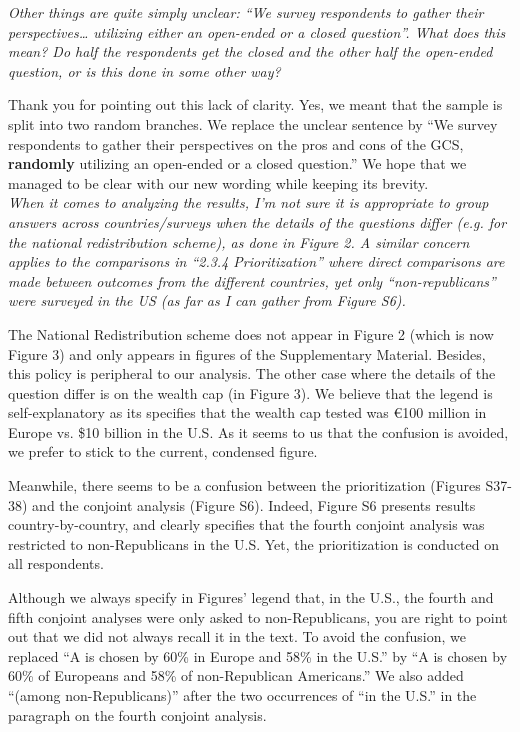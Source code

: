 \documentclass[12pt,english]{article}
\begin{document}
\textit{Other things are quite simply unclear: “We survey respondents to gather their perspectives… utilizing either an open-ended or a closed question”. What does this mean? Do half the respondents get the closed and the other half the open-ended question, or is this done in some other way?}

Thank you for pointing out this lack of clarity. Yes, we meant that the sample is split into two random branches. We replace the unclear sentence by ``We survey respondents to gather their perspectives on the pros and cons of the GCS, \textbf{randomly} utilizing an open-ended or a closed question.'' We hope that we managed to be clear with our new wording while keeping its brevity.
~\\

\textit{When it comes to analyzing the results, I’m not sure it is appropriate to group answers across countries/surveys when the details of the questions differ (e.g. for the national redistribution scheme), as done in Figure 2. A similar concern applies to the comparisons in “2.3.4 Prioritization” where direct comparisons are made between outcomes from the different countries, yet only “non-republicans” were surveyed in the US (as far as I can gather from Figure S6).}

The National Redistribution scheme does not appear in Figure 2 (which is now Figure 3) and only appears in figures of the Supplementary Material. Besides, this policy is peripheral to our analysis. The other case where the details of the question differ is on the wealth cap (in Figure 3). We believe that the legend is self-explanatory as its specifies that the wealth cap tested was \euro{}100 million in Europe vs. \$10 billion in the U.S. As it seems to us that the confusion is avoided, we prefer to stick to the current, condensed figure.

Meanwhile, there seems to be a confusion between the prioritization (Figures S37-38) %
and the conjoint analysis (Figure S6). Indeed, Figure S6 presents results country-by-country, and clearly specifies that the fourth conjoint analysis was restricted to non-Republicans in the U.S. Yet, the prioritization is conducted on all respondents.

Although we always specify in Figures' legend that, in the U.S., the fourth and fifth conjoint analyses were only asked to non-Republicans, you are right to point out that we did not always recall it in the text. To avoid the confusion, we replaced ``A is chosen by 60\% in Europe and 58\% in the U.S.'' by ``A is chosen by 60\% of Europeans and 58\% of non-Republican Americans.'' We also added ``(among non-Republicans)'' after the two occurrences of ``in the U.S.'' in the paragraph on the fourth conjoint analysis.
~\\
\end{document}
